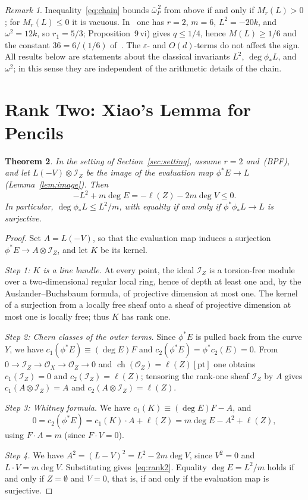 \documentclass[11pt]{article}
\newtheorem{theorem}{Theorem}[section]
\theoremstyle{definition}
\theoremstyle{remark}
\newtheorem{remark}[theorem]{Remark}
\DeclareMathOperator{\ch}{ch}
\newcommand{\OO}{\mathcal{O}}
\newcommand{\cI}{\mathcal{I}}
\newcommand{\ob}{\overline{\omega}}
\newcommand{\bpf}{\textup{(BPF)}}
\begin{document}
\begin{remark}\label{rem:chain}
Inequality~\eqref{eq:chain} bounds $\ob_P^{\,2}$ from above if and only if
$M_r(L)>0$; for $M_r(L)\le 0$ it is vacuous. In~\cite{So26} one has $r=2$, $m=6$,
$L^2=-20k$, and $\omega^2=12k$, so $r_1=5/3$; Proposition~9\,vi) gives $q\le 1/4$,
hence $M(L)\ge 1/6$ and the constant $36=6/(1/6)$ of~\cite[Theorem~1]{So26}. The
$\varepsilon$- and $O(d)$-terms do not affect the sign. All results below are
statements about the classical invariants $L^2$, $\deg\phi_*L$, and $\omega^2$;
in this sense they are independent of the arithmetic details of the chain.
\end{remark}

\section{Rank Two: Xiao's Lemma for Pencils}\label{sec:rank2}

\begin{theorem}\label{thm:rank2}
In the setting of Section~\ref{sec:setting}, assume $r=2$ and~\bpf, and let
$L(-V)\otimes\cI_Z$ be the image of the evaluation map
$\phi^*E\to L$ (Lemma~\ref{lem:image}). Then
\begin{equation}\label{eq:rank2}
-L^2+m\deg E=-\ell(Z)-2m\deg V\le 0 .
\end{equation}
In particular, $\deg\phi_*L\le L^2/m$, with equality if and only if
$\phi^*\phi_*L\to L$ is surjective.
\end{theorem}

\begin{proof}
Set $A=L(-V)$, so that the evaluation map induces a surjection $\phi^*E\to
A\otimes\cI_Z$, and let $K$ be its kernel.

\emph{Step 1: $K$ is a line bundle.} At every point, the ideal $\cI_Z$ is a
torsion-free module over a two-dimensional regular local ring, hence of depth at
least one and, by the Auslander--Buchsbaum formula, of projective dimension at
most one. The kernel of a surjection from a locally free sheaf onto a sheaf of
projective dimension at most one is locally free; thus $K$ has rank one.

\emph{Step 2: Chern classes of the outer terms.} Since $\phi^*E$ is pulled back
from the curve $Y$, we have $c_1(\phi^*E)\equiv(\deg E)F$ and
$c_2(\phi^*E)=\phi^*c_2(E)=0$. From $0\to\cI_Z\to\OO_X\to\OO_Z\to 0$ and
$\ch(\OO_Z)=\ell(Z)[\mathrm{pt}]$ one obtains $c_1(\cI_Z)=0$ and
$c_2(\cI_Z)=\ell(Z)$; tensoring the rank-one sheaf $\cI_Z$ by $A$ gives
$c_1(A\otimes\cI_Z)=A$ and $c_2(A\otimes\cI_Z)=\ell(Z)$.

\emph{Step 3: Whitney formula.} We have $c_1(K)\equiv(\deg E)F-A$, and
\[
0=c_2(\phi^*E)=c_1(K)\cdot A+\ell(Z)=m\deg E-A^2+\ell(Z),
\]
using $F\cdot A=m$ (since $F\cdot V=0$).

\emph{Step 4.} We have $A^2=(L-V)^2=L^2-2m\deg V$, since $V^2=0$ and $L\cdot V=m\deg
V$. Substituting gives~\eqref{eq:rank2}. Equality $\deg E=L^2/m$ holds if and
only if $Z=\emptyset$ and $V=0$, that is, if and only if the evaluation map is
surjective.
\end{proof}
\end{document}
